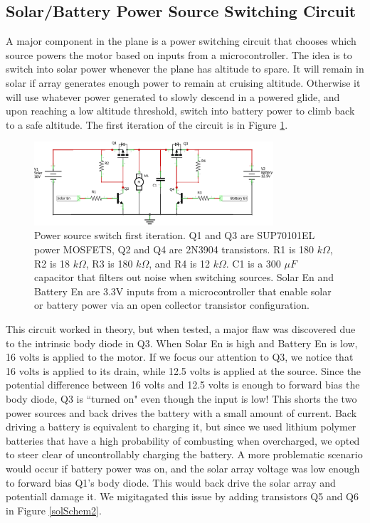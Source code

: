 \documentclass[12pt,journal,compsoc]{IEEEtran}
\begin{document}
\subsection{Solar/Battery Power Source Switching Circuit}
A major component in the plane is a power switching circuit that chooses which source powers the motor based on inputs from a microcontroller. The idea is to switch into solar power whenever the plane has altitude to spare. It will remain in solar if array generates enough power to remain at cruising altitude. Otherwise it will use whatever power generated to slowly descend in a powered glide, and upon reaching a low altitude threshold, switch into battery power to climb back to a safe altitude. The first iteration of the circuit is in Figure \ref{solSchem1}.
\begin{figure}[h!]
\hspace*{0cm}
\centering
\includegraphics[width=3.5in]{solar_circuit2_schem.png}
\caption{Power source switch first iteration. Q1 and Q3 are SUP70101EL power MOSFETS, Q2 and Q4 are 2N3904 transistors. R1 is 180 $k\Omega$, R2 is 18 $k\Omega$, R3 is 180 $k\Omega$, and R4 is 12 $k\Omega$. C1 is a 300 $\mu F$ capacitor that filters out noise when switching sources. Solar En and Battery En are 3.3V inputs from a microcontroller that enable solar or battery power via an open collector transistor configuration.}
\label{solSchem1}
\end{figure}
This circuit worked in theory, but when tested, a major flaw was discovered due to the intrinsic body diode in Q3. When Solar En is high and Battery En is low, 16 volts is applied to the motor. If we focus our attention to Q3, we notice that 16 volts is applied to its drain, while 12.5 volts is applied at the source. Since the potential difference between 16 volts and 12.5 volts is enough to forward bias the body diode, Q3 is ``turned on" even though the input is low! This shorts the two power sources and back drives the battery with a small amount of current. Back driving a battery is equivalent to charging it, but since we used lithium polymer batteries that have a high probability of combusting when overcharged, we opted to steer clear of uncontrollably charging the battery. A more problematic scenario would occur if battery power was on, and the solar array voltage was low enough to forward bias Q1's body diode. This would back drive the solar array and potentiall damage it. We migitagated this issue by adding transistors Q5 and Q6 in Figure \ref{solSchem2}.
\end{document}

